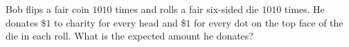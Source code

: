 Bob flips a fair coin $1010$ times and rolls a fair six-sided die $1010$ times. He donates $\$1$ to charity for every head and $\$1$ for every dot on the top face of the die in each roll. What is the expected amount he donates?
